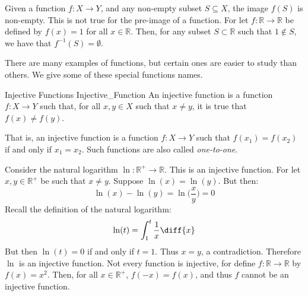 \documentclass[crop=false,class=book,oneside]{standalone}
\begin{document}
                \begin{lexample}
                    Given a function $f:X\rightarrow{Y}$, and any
                    non-empty subset $S\subseteq{X}$, the image
                    $f(S)$ is non-empty. This is not true for the
                    pre-image of a function. For let
                    $f:\mathbb{R}\rightarrow\mathbb{R}$ be defined by
                    $f(x)=1$ for all $x\in\mathbb{R}$. Then, for any
                    subset $S\subset\mathbb{R}$ such that
                    $1\notin{S}$, we have that
                    $f^{\minus{1}}(S)=\emptyset$.
                \end{lexample}
                There are many examples of functions, but certain
                ones are easier to study than others. We give some
                of these special functions names.
                \begin{ldefinition}{Injective Functions}
                      {Injective_Function}
                    An \gls{injective function} is a function
                    $f:X\rightarrow{Y}$ such that, for all
                    $x,y\in{X}$ such that $x\ne{y}$, it is true that
                    $f(x)\ne{f}(y)$.
                \end{ldefinition}
                That is, an injective function is a function
                $f:X\rightarrow{Y}$ such that $f(x_{1})=f(x_{2})$
                if and only if $x_{1}=x_{2}$. Such functions are also
                called \textit{one-to-one}.
                \begin{lexample}
                    Consider the natural logarithm
                    $\ln:\mathbb{R}^{+}\rightarrow\mathbb{R}$. This
                    is an injective function. For let
                    $x,y\in\mathbb{R}^{+}$ be such that $x\ne{y}$.
                    Suppose $\ln(x)=\ln(y)$. But then:
                    \begin{equation}
                        \ln(x)-\ln(y)=\ln\Big(\frac{x}{y}\Big)=0
                    \end{equation}
                    Recall the definition of the natural logarithm:
                    \begin{equation}
                        \ln(t)=\int_{1}^{t}\frac{1}{x}\diff{x}
                    \end{equation}
                    But then $\ln(t)=0$ if and only if $t=1$. Thus
                    $x=y$, a contradiction. Therefore $\ln$ is an
                    injective function. Not every function is
                    injective, for define
                    $f:\mathbb{R}\rightarrow\mathbb{R}$ by
                    $f(x)=x^{2}$. Then, for all $x\in\mathbb{R}^{+}$,
                    $f(\minus{x})=f(x)$, and thus $f$ cannot be an
                    injective function.
                \end{lexample}
\end{document}
